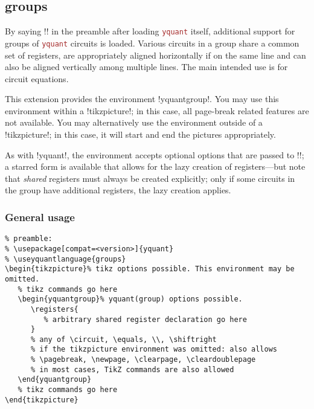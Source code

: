 \documentclass{scrartcl}
\def\pkg#1{\textcolor{brown}{\texttt{#1}}}
\def\Yquant{\pkg{yquant}}
\begin{document}
      \subsection[groups]{groups}\label{sec:foreign:groups}
         By saying \tex!! in the preamble after loading \Yquant{} itself, additional support for groups of \Yquant{} circuits is loaded.
         Various circuits in a group share a common set of registers, are appropriately aligned horizontally if on the same line and can also be aligned vertically among multiple lines.
         The main intended use is for circuit equations.

         This extension provides the environment \tex!yquantgroup!.
         You may use this environment within a \tex!tikzpicture!; in this case, all page\hyp break related features are not available.
         You may alternatively use the environment outside of a \tex!tikzpicture!; in this case, it will start and end the pictures appropriately.

         As with \tex!yquant!, the environment accepts optional options that are passed to \tex!\yquantset!; a starred form is available that allows for the lazy creation of registers---but note that \emph{shared} registers must always be created explicitly; only if some circuits in the group have additional registers, the lazy creation applies.

         \subsubsection{General usage}
            \begin{verbatim}
% preamble:
% \usepackage[compat=<version>]{yquant}
% \useyquantlanguage{groups}
\begin{tikzpicture}% tikz options possible. This environment may be omitted.
   % tikz commands go here
   \begin{yquantgroup}% yquant(group) options possible.
      \registers{
         % arbitrary shared register declaration go here
      }
      % any of \circuit, \equals, \\, \shiftright
      % if the tikzpicture environment was omitted: also allows
      % \pagebreak, \newpage, \clearpage, \cleardoublepage
      % in most cases, TikZ commands are also allowed
   \end{yquantgroup}
   % tikz commands go here
\end{tikzpicture}
            \end{verbatim}
\end{document}
